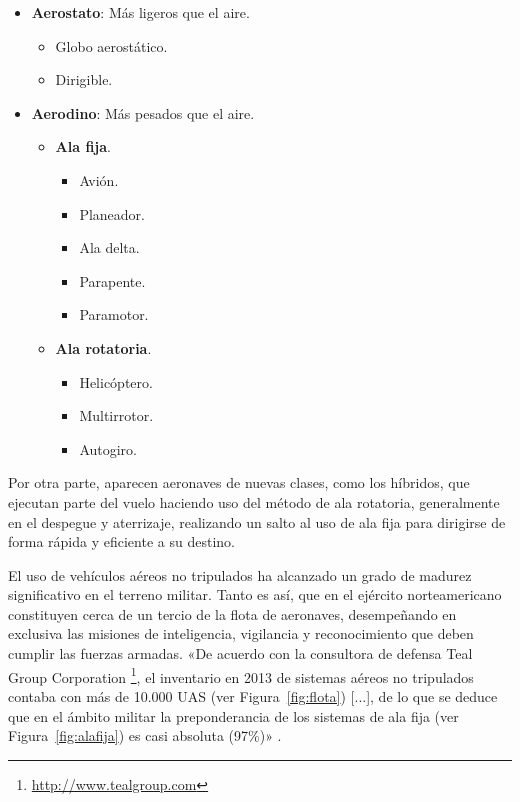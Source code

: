 \begin{itemize}
\item \textbf{Aerostato}: Más ligeros que el aire.
	\begin{itemize}
	\item Globo aerostático.
	\item Dirigible.
	\end{itemize}
\item \textbf{Aerodino}: Más pesados que el aire.
	\begin{itemize}
	\item \textbf{Ala fija}.
		\begin{itemize}
		\item Avión.
		\item Planeador.
		\item Ala delta.
		\item Parapente.
		\item Paramotor.
		\end{itemize}
	\item \textbf{Ala rotatoria}.
		\begin{itemize}
		\item Helicóptero.
		\item Multirrotor.
		\item Autogiro.
		\end{itemize}
	\end{itemize}
\end{itemize}

Por otra parte, aparecen aeronaves de nuevas clases, como los híbridos, que ejecutan parte del vuelo haciendo uso del método de ala rotatoria, generalmente en el despegue y aterrizaje, realizando un salto al uso de ala fija para dirigirse de forma rápida y eficiente a su destino.

El uso de vehículos aéreos no tripulados ha alcanzado un grado de madurez significativo en el terreno militar. Tanto es así, que 
en el ejército norteamericano constituyen cerca de un tercio de la flota de aeronaves, desempeñando en exclusiva las misiones 
de inteligencia, vigilancia y reconocimiento que deben cumplir las fuerzas armadas. «De acuerdo con la consultora de defensa Teal Group Corporation \footnote{\url{http://www.tealgroup.com}}, el inventario en 2013 de sistemas aéreos no tripulados contaba con más de 10.000 \acs{UAS} (ver Figura~\ref{fig:flota})  [...], de lo que se deduce que en el ámbito militar la preponderancia de los sistemas de ala fija (ver Figura~\ref{fig:alafija}) es casi absoluta (97\%)» \cite{dron2}.


